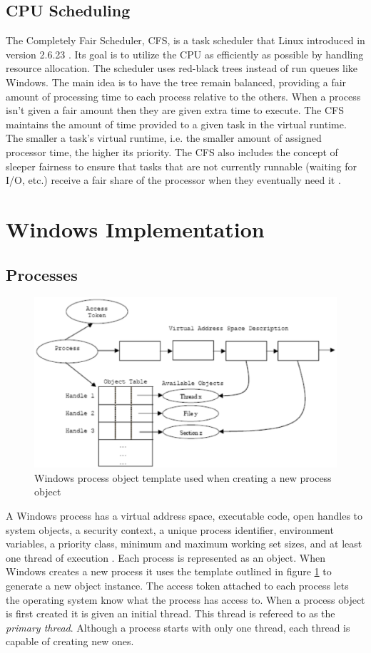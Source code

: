\documentclass[onecolumn,draftclsnofoot, 10pt, compsoc]{IEEEtran}
\begin{document}
\subsection{CPU Scheduling}
	The Completely Fair Scheduler, CFS, is a task scheduler that Linux introduced in version 2.6.23 \cite{schedulerLinux}. 
	Its goal is to utilize the CPU as efficiently as possible by handling resource allocation. 
	The scheduler uses red-black trees instead of run queues like Windows.
	The main idea is to have the tree remain balanced, providing a fair amount of processing time to each process relative to the others. 
	When a process isn't given a fair amount then they are given extra time to execute.
	The CFS maintains the amount of time provided to a given task in the virtual runtime. 
	The smaller a task's virtual runtime, i.e. the smaller amount of assigned processor time, the higher its priority. 
	The CFS also includes the concept of sleeper fairness to ensure that tasks that are not currently runnable (waiting for I/O, etc.) receive a fair share of the processor when they eventually need it \cite{schedulerLinux}.


\section{Windows Implementation}

\subsection{Processes}

	\begin{figure}[H]
		\includegraphics[width=.6\textwidth]{windowsProcessTemplate.eps}
		\centering
		\caption{Windows process object template used when creating a new process object \cite{windowsProcessMSDN}}
		\label{fig:mesh1}
	\end{figure}

	A Windows process has a virtual address space, executable code, open handles to system objects, a security context, a unique process identifier, environment variables, a priority class, minimum and maximum working set sizes, and at least one thread of execution \cite{windowsProcessMSDN}.
	Each process is represented as an object.
	When Windows creates a new process it uses the template outlined in figure \ref{fig:mesh1} to generate a new object instance. 
	The access token attached to each process lets the operating system know what the process has access to.
	When a process object is first created it is given an initial thread.
	This thread is refereed to as the \textit{primary thread}.
	Although a process starts with only one thread, each thread is capable of creating new ones.
	
\end{document}

